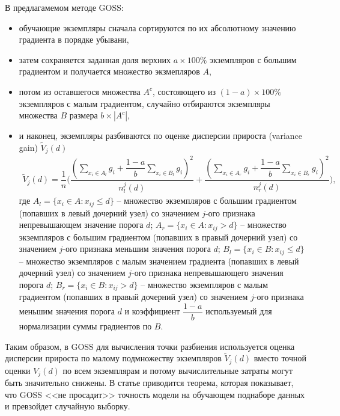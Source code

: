 \documentclass[%
	11pt,
	a4paper,
	utf8,
		]{article}
\begin{document}
В предлагамемом методе GOSS:
\begin{itemize}
	\item обучающие экземпляры сначала сортируются по их абсолютному значению градиента в порядке убывани,
	
	\item затем сохраняется заданная доля верхних $ a \times 100\% $ экземпляров с большим градиентом и получается множество экзмепляров $ A $,
	
	\item потом из оставшегося множества $ A^c $, состояющего из $ (1 - a) \times 100\% $ экземпляров с малым градиентом, случайно отбираются экземпляры множества $ B $ размера $ b \times |A^c| $,
	
	\item и наконец, экземпляры разбиваются по оценке дисперсии прироста (variance gain) $ \tilde{V}_j(d) $
\begin{align*}
	\tilde{V}_j(d) = \dfrac{1}{n} \Bigg( \dfrac{(\sum_{ x_i \in A_l } g_i +\dfrac{ 1 - a}{b} \sum_{ x_i \in B_l } g_i)^2 }{ n_l^j(d) } + \dfrac{ ( \sum_{x_i \in A_r} g_i + \dfrac{1 - a}{b} \sum_{x_i \in B_r} g_i )^2 }{ n_r^j(d) } \Bigg),
\end{align*}
где $ A_l = \{ x_i \in A: x_{ij} \leqslant d \} $ -- множество экземпляров с большим градиентом (попавших в левый дочерний узел) со значением $ j $-ого признака непревышающем значение порога $ d $;  $ A_r = \{ x_i \in A: x_{ij} > d \} $ -- множество экземпляров с большим градиентом (попавших в правый дочерний узел) со значением $ j $-ого признака меньшим значения порога $ d $; $ B_l = \{ x_i \in B: x_{ij} \leqslant d \} $ -- множество экземпляров с малым значением градиента (попавших в левый дочерний узел) со значением $ j $-ого признака непревышающего значения порога $ d $; $ B_r = \{ x_i \in B: x_{ij} > d \} $ -- множество экземпляров с малым градиентом (попавших в правый дочерний узел) со значением $ j $-ого признака меньшим значения порога $ d $ и коэффициент $ \dfrac{1 - a}{b} $ используемый для нормализации суммы градиентов по $ B $.
\end{itemize}

Таким образом, в GOSS для вычисления точки разбиения используется оценка дисперсии прироста по малому подмножеству экземпляров $ \tilde{V}_j(d) $  вместо точной оценки $ V_j(d) $ по всем экземплярам и потому вычислительные затраты могут быть значительно снижены. В статье приводится теорема, которая показывает, что GOSS <<не просадит>> точность модели на обучающем поднаборе данных и превзойдет случайную выборку.
\end{document}
